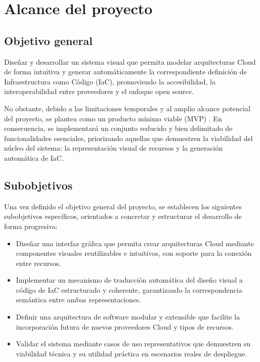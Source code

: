 \documentclass{article}
\begin{document}
    \section{Alcance del proyecto}
    {                 
        \setlength{\parskip}{1em}   
        \label{sec:Alcance}
        \subsection{Objetivo general}
        \justify
        Diseñar y desarrollar un sistema visual que permita modelar arquitecturas Cloud de 
        forma intuitiva y generar automáticamente la correspondiente definición de 
        Infraestructura como Código (IaC), promoviendo la accesibilidad, la interoperabilidad 
        entre proveedores y el enfoque open source.

        \justify
        No obstante, debido a las limitaciones temporales y al amplio alcance potencial del 
        proyecto, se plantea como un producto mínimo viable (MVP) \cite{noauthor_que_nodate-7}. 
        En consecuencia, se implementará un conjunto reducido y bien delimitado de 
        funcionalidades esenciales, priorizando aquellas que demuestren la viabilidad del 
        núcleo del sistema: la representación visual de recursos y la generación automática 
        de IaC.
        \par

        \subsection{Subobjetivos}
        \label{sec:Alcance_subobjetivos}
        \justify
        Una vez definido el objetivo general del proyecto, se establecen los siguientes 
        subobjetivos específicos, orientados a concretar y estructurar el desarrollo de 
        forma progresiva:

        \begin{itemize}
        \item Diseñar una interfaz gráfica que permita crear arquitecturas Cloud mediante 
        componentes visuales reutilizables e intuitivos, con soporte para la conexión 
        entre recursos.
        \item Implementar un mecanismo de traducción automática del diseño visual a código 
        de IaC estructurado y coherente, garantizando la correspondencia semántica entre 
        ambas representaciones.
        \item Definir una arquitectura de software modular y extensible que facilite la 
        incorporación futura de nuevos proveedores Cloud y tipos de recursos.
        \item Validar el sistema mediante casos de uso representativos que demuestren su 
        viabilidad técnica y su utilidad práctica en escenarios reales de despliegue.
        \end{itemize} 

}
\end{document}
